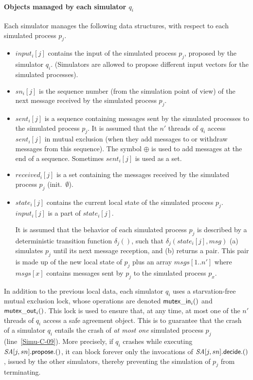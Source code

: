 \documentclass[11pt,letterpaper]{article}
\newcommand{\SA}{\mathit{SA}}
\begin{document}
\paragraph{Objects managed by each simulator $q_i$}
Each simulator manages the following data structures, with respect to each
simulated process $p_j$.
\begin{itemize}
\vspace{-0.2cm}
\item
$input_i[j]$ contains the input of the simulated process $p_j$,
proposed by the simulator $q_i$. (Simulators are allowed to propose
different input vectors for the simulated processes).
\vspace{-0.2cm}
\item
$sn_i[j]$ is the sequence number (from the simulation point of view) of the
next message received by the simulated process $p_j$.
\vspace{-0.2cm}
\item
$sent_i[j]$ is  a sequence containing  messages sent by the simulated
processes  to the simulated process $p_j$. It is assumed that the $n'$
threads of $q_i$ access $sent_i[j]$ in mutual exclusion
(when they add messages to or  withdraw  messages from this sequence).
The symbol $\oplus$ is used to add messages at the end of a sequence.
Sometimes $sent_i[j]$ is used as a set.
\vspace{-0.2cm}
\item
$received_i[j]$ is  a set containing the messages received by the simulated
process $p_j$ (init.~$\emptyset$).
\vspace{-0.2cm}
\item
$state_i[j]$ contains the current local state of the simulated process
$p_j$. $input_i[j]$ is a part of $state_i[j]$.

It is assumed that the behavior of each simulated process $p_j$ 
is described by a deterministic
transition function $\delta_j()$, such that  $\delta_j(state_i[j],msg)$
(a) simulates $p_j$ until its next message reception, and (b)
returns a pair. This pair is made up of the new local state of $p_j$ plus
an array $msgs[1..n']$ where  $msgs[x]$ contains  messages sent by $p_j$
to the simulated process $p_x$.
\end{itemize}


In addition to the previous local data, each simulator  $q_i$ uses a
starvation-free
mutual exclusion lock, whose operations are denoted ${\sf mutex\_in}_i()$
and ${\sf mutex\_out}_i()$. This lock is used to ensure that, at any time,
at most one of the $n'$ threads of $q_i$ access a safe agreement object.
This is to guarantee that the crash of a simulator $q_i$  entails the crash
of {\it at most one} simulated process $p_j$ (line~\ref{Simu-C-09}).
More precisely, if $q_i$ crashes while executing $\SA[j,sn].{\sf propose}.()$,
it can block forever  only the invocations of  $\SA[j,sn].{\sf decide}.()$,
issued by the other simulators, thereby preventing  the simulation of $p_j$
from terminating.
\end{document}
